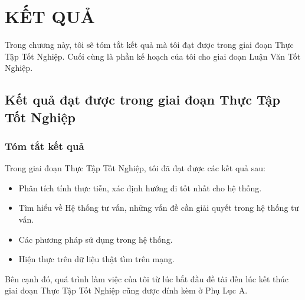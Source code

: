 \documentclass[a4paper,12pt,numbered,print,index,custombib, oneside, custommargin]{report}
\begin{document}
\chapter{KẾT QUẢ}

Trong chương này, tôi sẽ tóm tắt kết quả mà tôi đạt được trong giai đoạn Thực Tập Tốt Nghiệp. Cuối cùng là phần kế hoạch của tôi cho giai đoạn Luận Văn Tốt Nghiệp.

\section{Kết quả đạt được trong giai đoạn Thực Tập Tốt Nghiệp}
\subsection{Tóm tắt kết quả}
Trong giai đoạn Thực Tập Tốt Nghiệp, tôi đã đạt được các kết quả sau:
\begin{itemize}
\item Phân tích tính thực tiễn, xác định hướng đi tốt nhất cho hệ thống.
\item Tìm hiểu về Hệ thống tư vấn, những vấn đề cần giải quyết trong hệ thống tư vấn.
\item Các phương pháp sử dụng trong hệ thống.
\item Hiện thực trên dữ liệu thật tìm trên mạng.
\end{itemize} \par
Bên cạnh đó, quá trình làm việc của tôi từ lúc bắt đầu đề tài đến lúc kết thúc giai đoạn Thực Tập Tốt Nghiệp cũng được đính kèm ở Phụ Lục A. \par
\end{document}
